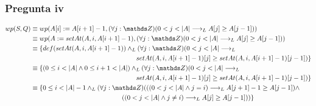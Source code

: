 \subsubsection{Pregunta iv}
\begin{align*}
    wp(S, Q) &\equiv wp(A[i] := A[i+1] - 1, (\forall j: \ent)(0 < j < |A| \implicaLuego A[j] \geq A[j-1])) \\
    &\equiv wp(A := setAt(A, i, A[i+1] - 1), (\forall j: \ent)(0 < j < |A| \implicaLuego A[j] \geq A[j-1])) \\
    &\equiv \{ def(setAt(A, i, A[i+1] - 1)) \yLuego (\forall j: \ent)(0 < j < |A| \implicaLuego \\ 
    &\qquad \qquad \qquad \qquad \qquad \qquad \qquad \qquad setAt(A, i, A[i+1] - 1)[j] \geq setAt(A, i, A[i+1] - 1)[j-1]) \} \\
    &\equiv \{ (0 \leq i < |A| \wedge 0 \leq i+1 < |A|) \yLuego (\forall j: \ent)(0 < j < |A| \implicaLuego \\ 
    &\qquad \qquad \qquad \qquad \qquad \qquad \qquad \qquad setAt(A, i, A[i+1] - 1)[j] \geq setAt(A, i, A[i+1] - 1)[j-1]) \} \\
    &\equiv \{ 0 \leq i < |A|-1 \yLuego (\forall j: \ent)(((0 < j < |A| \wedge j = i) \implicaLuego A[j+1]-1 \geq A[j-1]) \wedge \\
    &\qquad \qquad \qquad \qquad \qquad \qquad \quad \; \; \; ((0 < j < |A| \wedge j \neq i) \implicaLuego A[j] \geq A[j-1])) \} \\
\end{align*}

